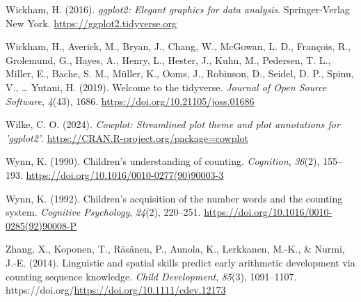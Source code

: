 \documentclass[
  man,floatsintext]{apa7}
\newlength{\cslhangindent}
\newenvironment{CSLReferences}[2] %
 {\begin{list}{}{%
  \setlength{\itemindent}{0pt}
  \setlength{\leftmargin}{0pt}
  \setlength{\parsep}{0pt}
  \ifodd #1
   \setlength{\leftmargin}{\cslhangindent}
   \setlength{\itemindent}{-1\cslhangindent}
  \fi
  \setlength{\itemsep}{#2\baselineskip}}}
 {\end{list}}
\begin{document}
\begin{CSLReferences}{1}{0}
Wickham, H. (2016). \emph{ggplot2: Elegant graphics for data analysis}. Springer-Verlag New York. \url{https://ggplot2.tidyverse.org}

Wickham, H., Averick, M., Bryan, J., Chang, W., McGowan, L. D., François, R., Grolemund, G., Hayes, A., Henry, L., Hester, J., Kuhn, M., Pedersen, T. L., Miller, E., Bache, S. M., Müller, K., Ooms, J., Robinson, D., Seidel, D. P., Spinu, V., \ldots{} Yutani, H. (2019). Welcome to the {tidyverse}. \emph{Journal of Open Source Software}, \emph{4}(43), 1686. \url{https://doi.org/10.21105/joss.01686}

Wilke, C. O. (2024). \emph{Cowplot: Streamlined plot theme and plot annotations for 'ggplot2'}. \url{https://CRAN.R-project.org/package=cowplot}

Wynn, K. (1990). Children's understanding of counting. \emph{Cognition}, \emph{36}(2), 155--193. \url{https://doi.org/10.1016/0010-0277(90)90003-3}

Wynn, K. (1992). Children's acquisition of the number words and the counting system. \emph{Cognitive Psychology}, \emph{24}(2), 220--251. \url{https://doi.org/10.1016/0010-0285(92)90008-P}

Zhang, X., Koponen, T., Räsänen, P., Aunola, K., Lerkkanen, M.-K., \& Nurmi, J.-E. (2014). Linguistic and spatial skills predict early arithmetic development via counting sequence knowledge. \emph{Child Development}, \emph{85}(3), 1091--1107. https://doi.org/\url{https://doi.org/10.1111/cdev.12173}

\end{CSLReferences}
\end{document}
